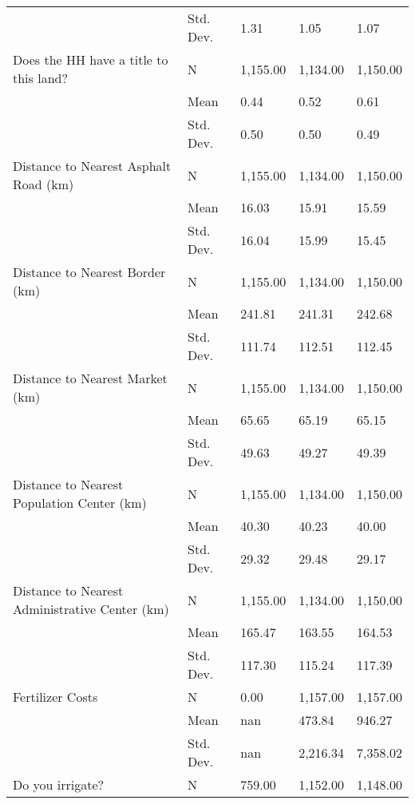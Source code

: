 \begin{longtable}{lllll}
                             & Std. Dev. &      1.31 &      1.05 &      1.07 \\
Does the HH have a title to this land? & N &  1,155.00 &  1,134.00 &  1,150.00 \\
                             & Mean &      0.44 &      0.52 &      0.61 \\
                             & Std. Dev. &      0.50 &      0.50 &      0.49 \\
Distance to Nearest Asphalt Road (km) & N &  1,155.00 &  1,134.00 &  1,150.00 \\
                             & Mean &     16.03 &     15.91 &     15.59 \\
                             & Std. Dev. &     16.04 &     15.99 &     15.45 \\
Distance to Nearest Border (km) & N &  1,155.00 &  1,134.00 &  1,150.00 \\
                             & Mean &    241.81 &    241.31 &    242.68 \\
                             & Std. Dev. &    111.74 &    112.51 &    112.45 \\
Distance to Nearest Market (km) & N &  1,155.00 &  1,134.00 &  1,150.00 \\
                             & Mean &     65.65 &     65.19 &     65.15 \\
                             & Std. Dev. &     49.63 &     49.27 &     49.39 \\
Distance to Nearest Population Center (km) & N &  1,155.00 &  1,134.00 &  1,150.00 \\
                             & Mean &     40.30 &     40.23 &     40.00 \\
                             & Std. Dev. &     29.32 &     29.48 &     29.17 \\
Distance to Nearest Administrative Center (km) & N &  1,155.00 &  1,134.00 &  1,150.00 \\
                             & Mean &    165.47 &    163.55 &    164.53 \\
                             & Std. Dev. &    117.30 &    115.24 &    117.39 \\
Fertilizer Costs & N &      0.00 &  1,157.00 &  1,157.00 \\
                             & Mean &       nan &    473.84 &    946.27 \\
                             & Std. Dev. &       nan &  2,216.34 &  7,358.02 \\
Do you irrigate? & N &    759.00 &  1,152.00 &  1,148.00 \\

\end{longtable}
